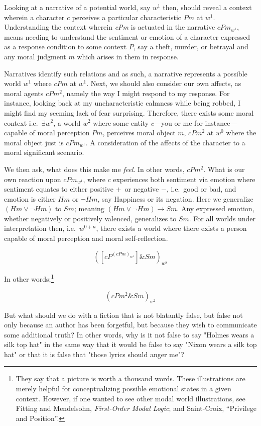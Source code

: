 \documentclass[phdthesis,12pt,final]{wuthesis}
\theoremstyle{definition}
\theoremstyle{definition}
\theoremstyle{definition}
\theoremstyle{definition}
\theoremstyle{remark}
\begin{document}
Looking at a narrative of a potential world, say \emph{\(w^1\)} then, should reveal a context wherein a character \(c\) perceives a particular characteristic \(Pm\) at \emph{\(w^1\)}. Understanding the context wherein \emph{cPm} is actuated in the narrative \(cPm_{w^{1}}\), means needing to understand the sentiment or emotion of a character expressed as a response condition to some context \(P\), say a theft, murder, or betrayal and any moral judgment \(m\) which arises in them in response.

Narratives identify such relations and as such, a narrative represents a possible world \(w^1\) where \(cPm\) at \(w^1\). Next, we should also consider our own affects, as moral agents \(cPm^{2}\), namely the way I might respond to my response. For instance, looking back at my uncharacteristic calmness while being robbed, I might find my seeming lack of fear surprising. Therefore, there exists some moral context i.e.~\(\exists w^2\), a world \(w^2\) where some entity \(c\)---you or me for instance---capable of moral perception \(Pm\), perceives moral object \(m\), \(cPm^{2}\) at \(w^0\) where the moral object just is \(cPm_{w^{1}}\). A consideration of the affects of the character to a moral significant scenario.

We then ask, what does this make me \emph{feel}. In other words, \(cPm^{2}\). What is our own reaction upon \(cPm_{w^1}\), where \(c\) experiences both sentiment via emotion where sentiment equates to either positive \(+\)~or negative \(-\), i.e.~good or bad, and emotion is either \(Hm\) or \(\neg Hm\), say Happiness or its negation. Here we generalize \(( Hm  \lor \neg  Hm)\) to \(Sm\); meaning \(( Hm \lor \neg Hm ) \rightarrow Sm\). Any expressed emotion, whether negatively or positively valenced, generalizes to \(Sm\). For all worlds under interpretation then, i.e.~\(w^{0+n}\), there exists a world where there exists a person capable of moral perception and moral self-reflection.

\[([cP^{( cPm )_{w^{1}}}] \& Sm)_{w^{2}}\]

In other words;\footnote{They say that a picture is worth a thousand words. These illustrations are merely helpful for conceptualizing possible emotional states in a given context. However, if one wanted to see other modal world illustrations, see Fitting and Mendelsohn, \emph{First-{Order Modal Logic}}; and Saint-Croix, {``Privilege and {Position}''}.}

\[( cPm^{2} \& Sm )_{w^{2}}\]

But what should we do with a fiction that is not blatantly false, but false not only because an author has been forgetful, but because they wish to communicate some additional truth? In other words, why is it not false to say "Holmes wears a silk top hat" in the same way that it would be false to say "Nixon wears a silk top hat" or that it is false that "those lyrics should anger me"?
\end{document}
